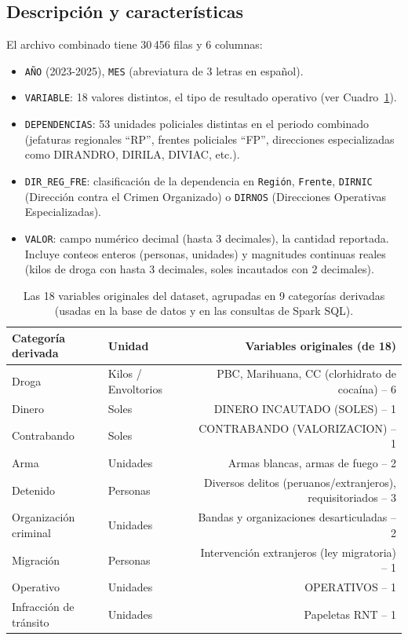 \documentclass[10pt,a4paper]{article}
\theoremstyle{definition}
\begin{document}
\subsection{Descripci\'on y caracter\'isticas}
El archivo combinado tiene 30\,456 filas y 6 columnas:
\begin{itemize}
  \item \texttt{A\~NO} (2023-2025), \texttt{MES} (abreviatura de 3 letras en espa\~nol).
  \item \texttt{VARIABLE}: 18 valores distintos, el tipo de resultado operativo (ver Cuadro~\ref{tab:variables}).
  \item \texttt{DEPENDENCIAS}: 53 unidades policiales distintas en el periodo combinado (jefaturas
    regionales ``RP'', frentes policiales ``FP'', direcciones especializadas como DIRANDRO, DIRILA,
    DIVIAC, etc.).
  \item \texttt{DIR\_REG\_FRE}: clasificaci\'on de la dependencia en \texttt{Regi\'on}, \texttt{Frente},
    \texttt{DIRNIC} (Direcci\'on contra el Crimen Organizado) o \texttt{DIRNOS} (Direcciones Operativas
    Especializadas).
  \item \texttt{VALOR}: campo num\'erico decimal (hasta 3 decimales), la cantidad reportada. Incluye
    conteos enteros (personas, unidades) y magnitudes continuas reales (kilos de droga con hasta 3
    decimales, soles incautados con 2 decimales).
\end{itemize}

\begin{table}[H]
\centering\small
\begin{tabular}{@{}llr@{}}
\toprule
\textbf{Categor\'ia derivada} & \textbf{Unidad} & \textbf{Variables originales (de 18)}\\
\midrule
Droga & Kilos / Envoltorios & PBC, Marihuana, CC (clorhidrato de coca\'ina) -- 6\\
Dinero & Soles & DINERO INCAUTADO (SOLES) -- 1\\
Contrabando & Soles & CONTRABANDO (VALORIZACION) -- 1\\
Arma & Unidades & Armas blancas, armas de fuego -- 2\\
Detenido & Personas & Diversos delitos (peruanos/extranjeros), requisitoriados -- 3\\
Organizaci\'on criminal & Unidades & Bandas y organizaciones desarticuladas -- 2\\
Migraci\'on & Personas & Intervenci\'on extranjeros (ley migratoria) -- 1\\
Operativo & Unidades & OPERATIVOS -- 1\\
Infracci\'on de tr\'ansito & Unidades & Papeletas RNT -- 1\\
\bottomrule
\end{tabular}
\caption{Las 18 variables originales del dataset, agrupadas en 9 categor\'ias derivadas (usadas en la
base de datos y en las consultas de Spark SQL).}
\label{tab:variables}
\end{table}
\end{document}
